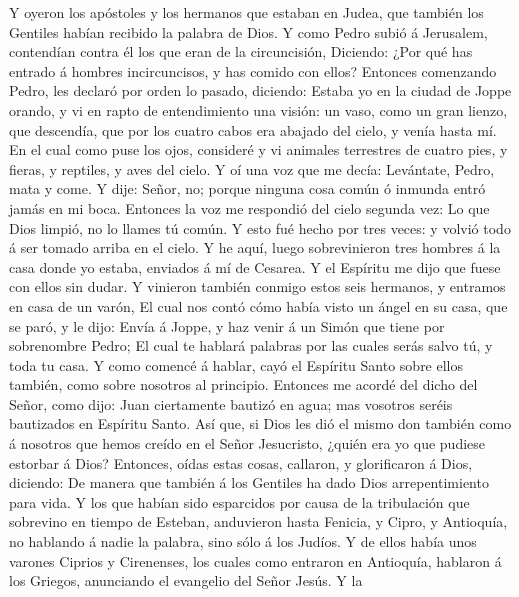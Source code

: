  Y oyeron los apóstoles y los hermanos que estaban en Judea,
que también los Gentiles habían recibido la palabra de Dios.
 Y como Pedro subió á Jerusalem, contendían contra él los
que eran de la circuncisión,  Diciendo: ¿Por qué has entrado
á hombres incircuncisos, y has comido con ellos?  Entonces
comenzando Pedro, les declaró por orden lo pasado, diciendo:
 Estaba yo en la ciudad de Joppe orando, y vi en rapto de
entendimiento una visión: un vaso, como un gran lienzo, que descendía,
que por los cuatro cabos era abajado del cielo, y venía hasta mí.
 En el cual como puse los ojos, consideré y vi animales
terrestres de cuatro pies, y fieras, y reptiles, y aves del cielo.
 Y oí una voz que me decía: Levántate, Pedro, mata y come.
 Y dije: Señor, no; porque ninguna cosa común ó inmunda
entró jamás en mi boca.  Entonces la voz me respondió del
cielo segunda vez: Lo que Dios limpió, no lo llames tú común.
 Y esto fué hecho por tres veces: y volvió todo á ser
tomado arriba en el cielo.  Y he aquí, luego sobrevinieron
tres hombres á la casa donde yo estaba, enviados á mí de Cesarea.
 Y el Espíritu me dijo que fuese con ellos sin dudar. Y
vinieron también conmigo estos seis hermanos, y entramos en casa de un
varón,  El cual nos contó cómo había visto un ángel en su
casa, que se paró, y le dijo: Envía á Joppe, y haz venir á un Simón que
tiene por sobrenombre Pedro;  El cual te hablará palabras
por las cuales serás salvo tú, y toda tu casa.  Y como
comencé á hablar, cayó el Espíritu Santo sobre ellos también, como sobre
nosotros al principio.  Entonces me acordé del dicho del
Señor, como dijo: Juan ciertamente bautizó en agua; mas vosotros seréis
bautizados en Espíritu Santo.  Así que, si Dios les dió el
mismo don también como á nosotros que hemos creído en el Señor
Jesucristo, ¿quién era yo que pudiese estorbar á Dios? 
Entonces, oídas estas cosas, callaron, y glorificaron á Dios, diciendo:
De manera que también á los Gentiles ha dado Dios arrepentimiento para
vida.  Y los que habían sido esparcidos por causa de la
tribulación que sobrevino en tiempo de Esteban, anduvieron hasta
Fenicia, y Cipro, y Antioquía, no hablando á nadie la palabra, sino sólo
á los Judíos.  Y de ellos había unos varones Ciprios y
Cirenenses, los cuales como entraron en Antioquía, hablaron á los
Griegos, anunciando el evangelio del Señor Jesús.  Y la
